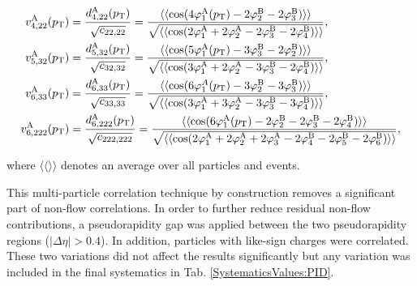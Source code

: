 \begin{align}
v_{4,22}^{\rm{A}}(p_{\rm{T}}) &= \frac{d_{4,22}^{\rm{A}}(p_{\rm{T}})}{\sqrt{c_{22,22}}} =  \frac{\langle\langle \cos(4\varphi^{\rm{A}}_{1}(p_{\rm{T}})-2\varphi^{\rm{B}}_{2}-2\varphi^{\rm{B}}_{3})\rangle\rangle}{\sqrt{\langle\langle \cos(2\varphi^{\rm{A}}_{1}+2\varphi^{\rm{A}}_{2}-2\varphi^{\rm{B}}_{3}-2\varphi^{\rm{B}}_{4}) \rangle\rangle}}, \label{Eq:VA422} \\
v_{5,32}^{\rm{A}}(p_{\rm{T}}) &= \frac{d_{5,32}^{\rm{A}}(p_{\rm{T}})}{\sqrt{c_{32,32}}} = \frac{\langle\langle \cos(5\varphi^{\rm{A}}_{1}(p_{\rm{T}})-3\varphi^{\rm{B}}_{3}-2\varphi^{\rm{B}}_{2})\rangle\rangle}{\sqrt{\langle\langle \cos(3\varphi^{\rm{A}}_{1}+2\varphi^{\rm{A}}_{2}-3\varphi^{\rm{B}}_{3}-2\varphi^{\rm{B}}_{4}) \rangle\rangle}}, \label{Eq:VA532}\\
v_{6,33}^{\rm{A}}(p_{\rm{T}}) &= \frac{d_{6,33}^{\rm{A}}(p_{\rm{T}})}{\sqrt{c_{33,33}}} =\frac{\langle\langle \cos(6\varphi^{A}_{1}(p_{\rm{T}})-3\varphi^{\rm{B}}_{2}-3\varphi^{\rm{B}}_{3})\rangle\rangle}{\sqrt{\langle\langle \cos(3\varphi^{\rm{A}}_{1}+3\varphi^{\rm{A}}_{2}-3\varphi^{\rm{B}}_{3}-3\varphi^{\rm{B}}_{4}) \rangle\rangle}}, \label{Eq:VA633}\\
v_{6,222}^{\rm{A}}(p_{\rm{T}}) &= \frac{d_{6,222}^{\rm{A}}(p_{\rm{T}})}{\sqrt{c_{222,222}}} =\frac{\langle\langle \cos(6\varphi^{\rm{A}}_{1}(p_{\rm{T}})-2\varphi^{\rm{B}}_{2}-2\varphi^{\rm{B}}_{3}-2\varphi^{\rm{B}}_{4})\rangle\rangle}{\sqrt{\langle\langle \cos(2\varphi^{\rm{A}}_{1}+2\varphi^{\rm{A}}_{2}+2\varphi^{\rm{A}}_{3}-2\varphi^{\rm{B}}_{4}-2\varphi^{\rm{B}}_{5}-2\varphi^{\rm{B}}_{6}) \rangle\rangle}},
\label{Eq:VA6222}
\end{align}

where $\langle\langle\rangle\rangle$ denotes an average over all particles and events.

This multi-particle correlation technique by construction removes a significant part of non-flow correlations. In order to further reduce residual non-flow contributions, a pseudorapidity gap was applied between the two pseudorapidity regions ($|\Delta\eta|>0.4$). In addition, particles with like-sign charges were correlated. These two variations did not affect the results significantly but any variation was included in the final systematics in Tab. \ref{SystematicsValues:PID}.


